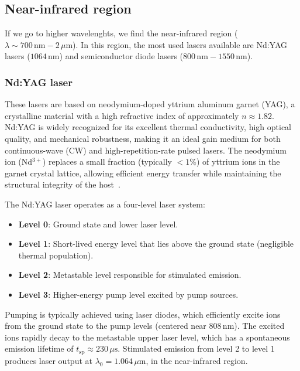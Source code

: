 \documentclass[prl,twocolumn]{revtex4-1}
\begin{document}
\subsection{\textbf{Near-infrared region}}

If we go to higher wavelenghts, we find the near-infrared region ($\lambda \sim 700 \, \text{nm} - 2 \, \mu\text{m}$). In this region, the most used lasers available are Nd:YAG lasers ($1064 \, \text{nm}$) and semiconductor diode lasers ($800 \, \text{nm} - 1550 \, \text{nm}$).

\subsubsection{\textbf{Nd:YAG laser}}
These lasers are based on neodymium-doped yttrium aluminum garnet (YAG), a crystalline material with a high refractive index of approximately \( n \approx 1.82 \). Nd:YAG is widely recognized for its excellent thermal conductivity, high optical quality, and mechanical robustness, making it an ideal gain medium for both continuous-wave (CW) and high-repetition-rate pulsed lasers. The neodymium ion (Nd\(^{3+}\)) replaces a small fraction (typically \( < 1\% \)) of yttrium ions in the garnet crystal lattice, allowing efficient energy transfer while maintaining the structural integrity of the host~\cite{ndyag_lasers}.

The Nd:YAG laser operates as a four-level laser system:
\begin{itemize}
  \item \textbf{Level 0}: Ground state and lower laser level.
  \item \textbf{Level 1}: Short-lived energy level that lies above the ground state (negligible thermal population).
  \item \textbf{Level 2}: Metastable level responsible for stimulated emission.
  \item \textbf{Level 3}: Higher-energy pump level excited by pump sources.
\end{itemize}

Pumping is typically achieved using laser diodes, which efficiently excite ions from the ground state to the pump levels (centered near \( 808 \, \text{nm} \)). The excited ions rapidly decay to the metastable upper laser level, which has a spontaneous emission lifetime of \( t_{\text{sp}} \approx 230 \, \mu\text{s} \). Stimulated emission from level 2 to level 1 produces laser output at \( \lambda_0 = 1.064 \, \mu\text{m} \), in the near-infrared region.
\end{document}
